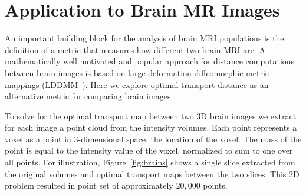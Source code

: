 \documentclass[twoside,11pt]{article}
\begin{document}
\section{Application to Brain MR Images}
\label{s:brainMR}
An important building block for the analysis of brain MRI populations is the
definition of a metric that measures how different two brain MRI are. A
mathematically well motivated and popular approach for distance computations
between brain images is based on large deformation diffeomorphic metric mappings
(LDDMM~\citep{miller2002metrics}). Here we explore optimal transport distance
as an alternative metric for comparing brain images.

To solve for the optimal transport map between two 3D brain images we extract
for each image a point cloud from the intensity volumes. Each point represents
a voxel as a point in 3-dimensional space, the location of the voxel. The mass
of the point is equal to the intensity value of the voxel, normalized to sum to
one over all points.  For illustration, Figure~\ref{fig:brains} shows a single
slice extracted from the original volumes and optimal transport maps between
the two slices. This 2D problem resulted in point set of approximately $20,000$
points. 
\end{document}
